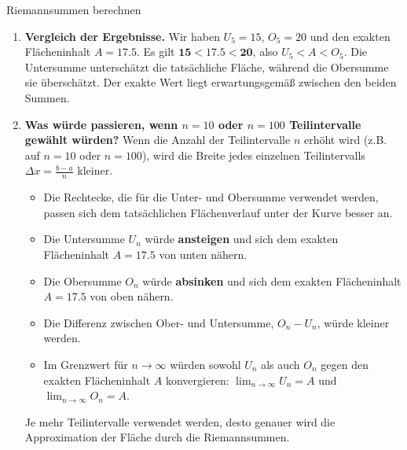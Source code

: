 \begin{loesungsumgebung}{Riemannsummen berechnen}
\begin{enumerate}[label=(\alph*)]
    \item \textbf{Vergleich der Ergebnisse.}
    Wir haben $U_5 = 15$, $O_5 = 20$ und den exakten Flächeninhalt $A = 17.5$.
    Es gilt $\mathbf{15 < 17.5 < 20}$, also $U_5 < A < O_5$.
    Die Untersumme unterschätzt die tatsächliche Fläche, während die Obersumme sie überschätzt. Der exakte Wert liegt erwartungsgemäß zwischen den beiden Summen.

    \item \textbf{Was würde passieren, wenn $n=10$ oder $n=100$ Teilintervalle gewählt würden?}
    Wenn die Anzahl der Teilintervalle $n$ erhöht wird (z.B. auf $n=10$ oder $n=100$), wird die Breite jedes einzelnen Teilintervalls $\Delta x = \frac{b-a}{n}$ kleiner.
    \begin{itemize}
        \item Die Rechtecke, die für die Unter- und Obersumme verwendet werden, passen sich dem tatsächlichen Flächenverlauf unter der Kurve besser an.
        \item Die Untersumme $U_n$ würde \textbf{ansteigen} und sich dem exakten Flächeninhalt $A=17.5$ von unten nähern.
        \item Die Obersumme $O_n$ würde \textbf{absinken} und sich dem exakten Flächeninhalt $A=17.5$ von oben nähern.
        \item Die Differenz zwischen Ober- und Untersumme, $O_n - U_n$, würde kleiner werden.
        \item Im Grenzwert für $n \to \infty$ würden sowohl $U_n$ als auch $O_n$ gegen den exakten Flächeninhalt $A$ konvergieren: $\lim_{n \to \infty} U_n = A$ und $\lim_{n \to \infty} O_n = A$.
    \end{itemize}
    Je mehr Teilintervalle verwendet werden, desto genauer wird die Approximation der Fläche durch die Riemannsummen.
\end{enumerate}

\end{loesungsumgebung}

